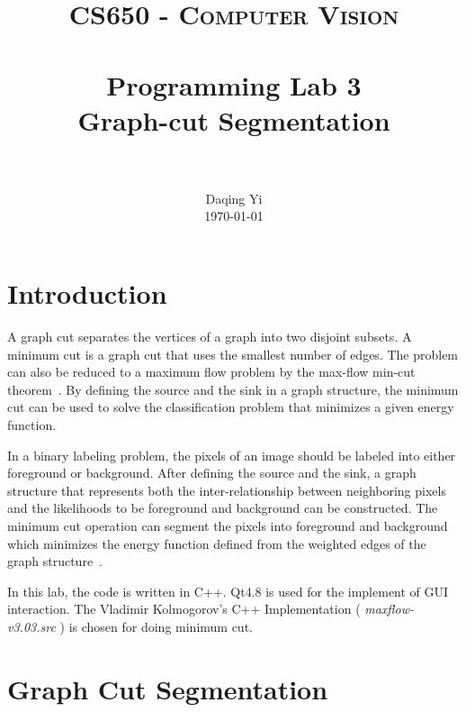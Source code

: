 \documentclass[paper=a4, fontsize=11pt]{scrartcl}
\title{
		\usefont{OT1}{bch}{b}{n}
		\normalfont \normalsize \textsc{CS650 - Computer Vision} \\ [25pt]
		\horrule{0.5pt} \\[0.4cm]
		\huge Programming Lab 3 \\ Graph-cut Segmentation \\
		\horrule{2pt} \\[0.5cm]
}
\author{
		\normalfont 								\normalsize
        Daqing Yi\\[-3pt]		\normalsize
        \today
}
\date{}
\begin{document}
\maketitle

\section{Introduction}

A graph cut separates the vertices of a graph into two disjoint subsets.
A minimum cut is a graph cut that uses the smallest number of edges.
The problem can also be reduced to a maximum flow problem by the max-flow min-cut theorem~\cite{wiki:Max-flow_min-cut_theorem}.
By defining the source and the sink in a graph structure, the minimum cut can be used to solve the classification problem that minimizes a given energy function.

In a binary labeling problem, the pixels of an image should be labeled into either foreground or background.
After defining the source and the sink, a graph structure that represents both the inter-relationship between neighboring pixels and the likelihoods to be foreground and background can be constructed.
The minimum cut operation can segment the pixels into foreground and background which minimizes the energy function defined from the weighted edges of the graph structure~\cite{937505}.

In this lab, the code is written in C++.
Qt4.8 is used for the implement of GUI interaction.
The Vladimir Kolmogorov's C++ Implementation ( \emph{ maxflow-v3.03.src } ) is chosen for doing minimum cut.

\section{Graph Cut Segmentation}
\end{document}
